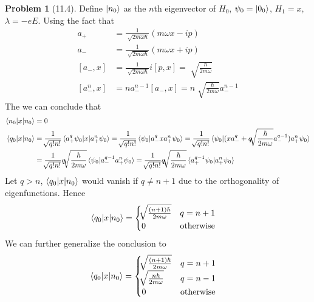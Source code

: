 \documentclass[twoside,11pt]{article}
\theoremstyle{definition}
\newtheorem{problem}{Problem}
\theoremstyle{remark}
\begin{document}
\begin{problem}[11.4]
Define $\ket{n_0}$ as the $n$th eigenvector of $H_0$, $\psi_0=\ket{0_0}$,
$H_1=x$, $\lambda=-eE$.
Using the fact that
\begin{align*}
    a_+ & = \frac{1}{\sqrt[]{2m\omega\hbar}}(m\omega x - ip)\\
    a_- & = \frac{1}{\sqrt[]{2m\omega\hbar}}(m\omega x + ip)\\
    [a_-, x] &= \frac{1}{\sqrt[]{2m\omega\hbar}}i[p,x] = \sqrt[]{\frac{\hbar}{2m\omega}}\\
    [a_-^n, x] &= na_-^{n-1}[a_-, x] = n\sqrt[]{\frac{\hbar}{2m\omega}}a_-^{n-1}
\end{align*}
The we can conclude that
\begin{align*}
    \braket{n_0|x|n_0} &= 0 \\
    \braket{q_0|x|n_0} &= \frac{1}{\sqrt[]{q! n!}}\braket{a_+^q\psi_0|x|a_+^n\psi_0} 
    = \frac{1}{\sqrt[]{q! n!}}\braket{\psi_0|a_-^qxa_+^n\psi_0}
    = \frac{1}{\sqrt[]{q! n!}}\braket{\psi_0|(xa_-^q+ q\sqrt[]{\frac{\hbar}{2m\omega}}a_-^{q-1})a_+^n\psi_0}\\
    &= \frac{1}{\sqrt[]{q! n!}}q\sqrt[]{\frac{\hbar}{2m\omega}}\braket{\psi_0|a_-^{q-1} a_+^n\psi_0}
    = \frac{1}{\sqrt[]{q! n!}}q\sqrt[]{\frac{\hbar}{2m\omega}}\braket{a_+^{q-1}\psi_0| a_+^n\psi_0}
\end{align*}
Let $q>n$, $\braket{q_0|x|n_0}$ would vanish if $q\neq n+1$ due to the
orthogonality of eigenfunctions. Hence
\begin{align*}
    \braket{q_0|x|n_0} &=\begin{cases}
        \sqrt[]{\frac{(n+1)\hbar}{2m\omega}} & q = n+1\\
        0 & \text{otherwise}
    \end{cases}
\end{align*}
We can further generalize the conclusion to
\begin{align*}
    \braket{q_0|x|n_0} &=\begin{cases}
        \sqrt[]{\frac{(n+1)\hbar}{2m\omega}} & q = n+1\\
        \sqrt[]{\frac{n\hbar}{2m\omega}} & q = n-1\\
        0 & \text{otherwise}
    \end{cases}
\end{align*}


\end{problem}
\end{document}
